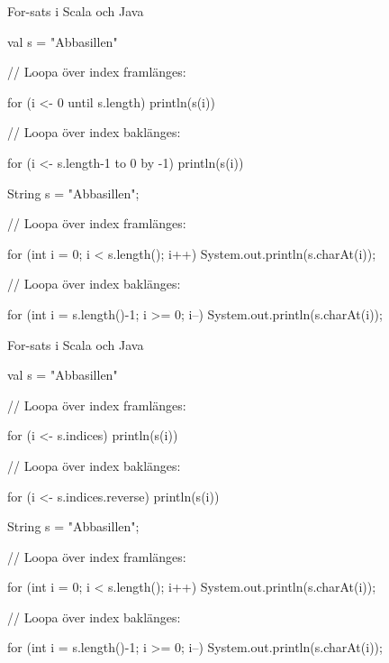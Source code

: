 \begin{Slide}{For-sats i Scala och Java}
\begin{multicols}{2}
\begin{CodeSmall}[basicstyle=\ttfamily\SlideFontSize{6}{8}]
val s = "Abbasillen"

// Loopa över index framlänges:
  
for (i <- 0 until s.length) {
  println(s(i))
}
  
// Loopa över index baklänges:
 
for (i <- s.length-1 to 0 by -1) {
  println(s(i))
}  
\end{CodeSmall}

\columnbreak

\begin{CodeSmall}[language=Java,basicstyle=\ttfamily\SlideFontSize{6}{8}]
String s = "Abbasillen";

// Loopa över index framlänges:

for (int i = 0; i < s.length(); i++) {
    System.out.println(s.charAt(i));
}

// Loopa över index baklänges:
 
for (int i = s.length()-1; i >= 0; i--) {
    System.out.println(s.charAt(i));
}
\end{CodeSmall}
\end{multicols}
\end{Slide}

\begin{Slide}{For-sats i Scala och Java}
\begin{multicols}{2}
\begin{CodeSmall}[basicstyle=\ttfamily\SlideFontSize{6}{8}]
val s = "Abbasillen"

// Loopa över index framlänges:
  
for (i <- s.indices) {
  println(s(i))
}
  
// Loopa över index baklänges:
 
for (i <- s.indices.reverse) {
  println(s(i))
}
\end{CodeSmall}

\columnbreak

\begin{CodeSmall}[language=Java,basicstyle=\ttfamily\SlideFontSize{6}{8}]
String s = "Abbasillen";

// Loopa över index framlänges:

for (int i = 0; i < s.length(); i++) {
    System.out.println(s.charAt(i));
}

// Loopa över index baklänges:
 
for (int i = s.length()-1; i >= 0; i--) {
    System.out.println(s.charAt(i));
}
\end{CodeSmall}
\end{multicols}
\end{Slide}



